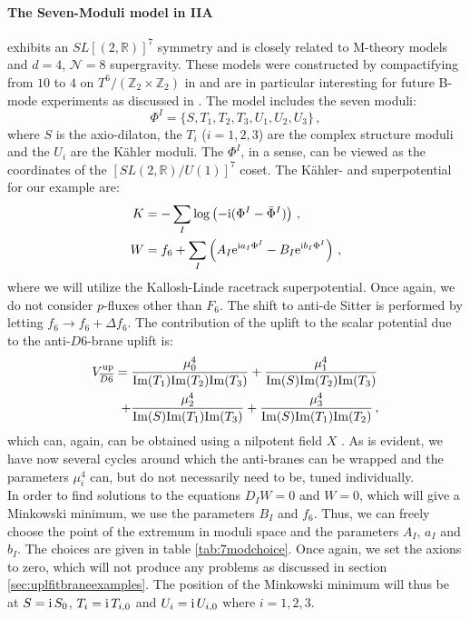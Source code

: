 \documentclass[a4paper,12pt,twoside,openright]{report}
\newcommand{\be}{\begin{equation}}
\newcommand{\ee}{\end{equation}}
\newcommand{\bea}{\begin{equation}\begin{aligned}}
\newcommand{\eea}{\end{aligned}\end{equation}}
\def\rmi{{\rm i}}
\def\rme{{\rm e}}
\def\rmim{{\rm Im}}
\begin{document}
\paragraph{The Seven-Moduli model in IIA} exhibits an $SL[(2,\mathbb{R})]^7$ symmetry and is closely related to M-theory models and $d=4$, $\mathcal{N}=8$ supergravity. These models were constructed by compactifying from $10$ to $4$ on $T^6/(\mathbb{Z}_2 \times \mathbb{Z}_2)$ in \cite{Derendinger:2004jn,Villadoro:2005cu} and are in particular interesting for future B-mode experiments as discussed in \cite{Ferrara:2016fwe,Kallosh:2017ced}. The model includes the seven moduli:
\be 
\Phi^I = \{S,T_1,T_2,T_3,U_1,U_2,U_3\}\,,
\ee
where $S$ is the axio-dilaton, the $T_i$ ($i=1,2,3$) are the complex structure moduli and the $U_i$ are the Kähler moduli. The $\Phi^I$, in a sense, can be viewed as the coordinates of the $[SL(2,\mathbb{R})/U(1)]^7$ coset. The Kähler- and superpotential for our example are:
\bea 
\label{eq:massIIA7modpot}
K &= - \sum_I \log \left(-\rmi (\Phi^I -\bar{\Phi}^I)\right)\,,\\
W &= f_6 + \sum_I \left( A_I \rme^{\rmi a_I \Phi^I} - B_I \rme^{\rmi b_I \Phi^I} \right)\,,
\eea 
where we will utilize the Kallosh-Linde racetrack superpotential. Once again, we do not consider $p$-fluxes other than $F_6$. The shift to anti-de Sitter is performed by letting $f_6 \to f_6 + \Delta f_6$. The contribution of the uplift to the scalar potential due to the anti-$D6$-brane uplift is:
\bea
V_{\overline{D6}}^{\text{up}} =\; & \frac{\mu_0^4}{\rmim(T_1)\rmim(T_2)\rmim(T_3)} + \frac{\mu_1^4}{\rmim(S)\rmim(T_2)\rmim(T_3)} \\+ & \frac{\mu_2^4}{\rmim(S)\rmim(T_1)\rmim(T_3)} + \frac{\mu_3^4}{\rmim(S)\rmim(T_1)\rmim(T_2)}\,,
\eea
which can, again, can be obtained using a nilpotent field $X$ \cite{Kallosh:2018nrk,Cribiori:2019bfx}. As is evident, we have now several cycles around which the anti-branes can be wrapped and the parameters $\mu_i^4$ can, but do not necessarily need to be, tuned individually.\\
In order to find solutions to the equations $D_I W =0$ and $W=0$, which will give a Minkowski minimum, we use the parameters $B_I$ and $f_6$. Thus, we can freely choose the point of the extremum in moduli space and the parameters $A_I$, $a_I$ and $b_I$. The choices are given in table \ref{tab:7modchoice}. Once again, we set the axions to zero, which will not produce any problems as discussed in section \ref{sec:uplfitbraneexamples}. The position of the Minkowski minimum will thus be at $S=\rmi \,S_0$, $T_i = \rmi \,T_{i,0}$ and $U_i = \rmi \,U_{i,0}$ where $i=1,2,3$.\\
\end{document}
